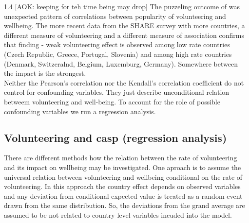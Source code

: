 \documentclass[10pt, letterpaper]{article}
\begin{document}
\begin{spacing}{1.4}
[AOK: keeping for teh time being may drop]
The puzzeling outcome of \citet{haski09} was unexpected pattern of correlations between  popularity of volunteering and wellbeing.  The more recent data from the SHARE survey with more countries, a different measure of volunteering and a different measure of association confirms that finding - weak volunteering effect is observed among low rate countries (Czech Republic, Greece, Portugal, Slovenia) and among high rate countries (Denmark, Switzeralnd, Belgium, Luxemburg, Germany). Somewhere between the impact is the strongest. \\

Neither the Pearson's correlation nor the Kendall's correlation coefficient  do not control for confounding variables. They just describe unconditional relation betweem volunteering and well-being. To account for the role of possible confounding variables we run a regression analysis.   


\subsection*{Volunteering and casp (regression analysis)}

There are different methods how the relation between the rate of volunteering and its impact on wellbeing may be investigated. One aproach is to assume the universal relation between volunteering and wellbeing conditional on the rate of volunteering. In this approach the country effect depends on observed variables and any deviation from conditional expected value is treated as a random event drawn from the same distribution. So, the deviations from the grand average are assumed to be not related to country level variables incuded into the model. \\


\end{spacing}
\end{document}
